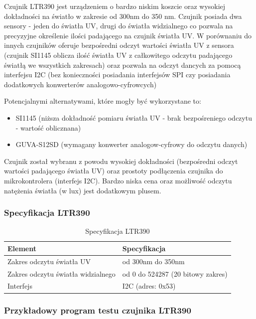 \documentclass[12pt,a4paper]{article}
\begin{document}
Czujnik LTR390 jest urządzeniem o bardzo niskim koszcie oraz wysokiej dokładności na światło w zakresie od 300nm do 350 nm. Czujnik posiada dwa sensory - jeden do światła UV, drugi do światła widzialnego 
co pozwala na precyzyjne określenie ilości padającego na czujnik światła UV. W porównaniu do innych czujników oferuje bezpośredni odczyt wartości światła UV z sensora (czujnik SI1145 oblicza ilość światła UV z całkowitego odczytu padającego światłą we wszystkich zakresach) 
oraz pozwala na odczyt dancych za pomocą interfejsu I2C (bez konieczności posiadania interfejsów SPI czy posiadania dodatkowych konwerterów analogowo-cyfrowcych) 

Potencjalnymi alternatywami, które mogły być wykorzystane to:
\begin{itemize}
    \item SI1145 (niższa dokładność pomiaru światła UV - brak bezpośreniego odczytu - wartość oblicznana)
    \item GUVA-S12SD (wymagany konwerter analogow-cyfrowy do odczytu danych)
\end{itemize}

Czujnik został wybranu z powodu wysokiej dokładności (bezpośredni odczyt wartości padającego światła UV) oraz prostoty podłączenia czujnika do mikrokontrolera (interfejs I2C). 
Bardzo niska cena oraz możliwość odczytu natężenia światła (w lux) jest dodatkowym plusem.

\subsubsection{Specyfikacja LTR390}

\begin{table}[H]
    \centering
    \begin{tabular}{|l|l|}
        \hline
        Element & Specyfikacja \\
        \hline
        Zakres odczytu światła UV & od 300nm do 350nm \\
        \hline
        Zakres odczytu światła widzialnego & od 0 do 524287 (20 bitowy zakres) \\
        \hline
        Interfejs & I2C (adres: 0x53) \\
        \hline
    \end{tabular}
    \caption{Specyfikacja LTR390}
    \label{ltr390-spec}
\end{table}

\subsubsection{Przykładowy program testu czujnika LTR390}
\end{document}

